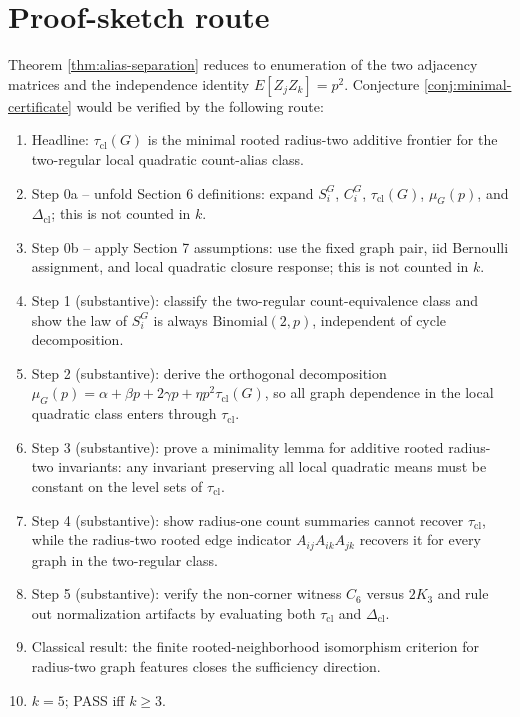 \documentclass[11pt]{article}
\theoremstyle{definition}
\theoremstyle{plain}
\theoremstyle{remark}
\begin{document}
\section{Proof-sketch route}
Theorem \ref{thm:alias-separation} reduces to enumeration of the two adjacency matrices and the independence identity \(E[Z_jZ_k]=p^2\). Conjecture \ref{conj:minimal-certificate} would be verified by the following route:
\begin{enumerate}[leftmargin=*]
\item Headline: \(\tau_{\mathrm{cl}}(G)\) is the minimal rooted radius-two additive frontier for the two-regular local quadratic count-alias class.
\item Step 0a -- unfold Section 6 definitions: expand \(S_i^G\), \(C_i^G\), \(\tau_{\mathrm{cl}}(G)\), \(\mu_G(p)\), and \(\Delta_{\mathrm{cl}}\); this is not counted in \(k\).
\item Step 0b -- apply Section 7 assumptions: use the fixed graph pair, iid Bernoulli assignment, and local quadratic closure response; this is not counted in \(k\).
\item Step 1 (substantive): classify the two-regular count-equivalence class and show the law of \(S_i^G\) is always \(\mathrm{Binomial}(2,p)\), independent of cycle decomposition.
\item Step 2 (substantive): derive the orthogonal decomposition \(\mu_G(p)=\alpha+\beta p+2\gamma p+\eta p^2\tau_{\mathrm{cl}}(G)\), so all graph dependence in the local quadratic class enters through \(\tau_{\mathrm{cl}}\).
\item Step 3 (substantive): prove a minimality lemma for additive rooted radius-two invariants: any invariant preserving all local quadratic means must be constant on the level sets of \(\tau_{\mathrm{cl}}\).
\item Step 4 (substantive): show radius-one count summaries cannot recover \(\tau_{\mathrm{cl}}\), while the radius-two rooted edge indicator \(A_{ij}A_{ik}A_{jk}\) recovers it for every graph in the two-regular class.
\item Step 5 (substantive): verify the non-corner witness \(C_6\) versus \(2K_3\) and rule out normalization artifacts by evaluating both \(\tau_{\mathrm{cl}}\) and \(\Delta_{\mathrm{cl}}\).
\item Classical result: the finite rooted-neighborhood isomorphism criterion for radius-two graph features closes the sufficiency direction.
\item \(k=5\); PASS iff \(k\ge3\).
\end{enumerate}
\end{document}
